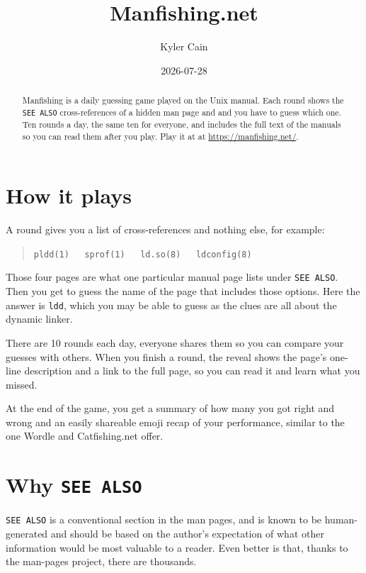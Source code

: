 \documentclass{article}
\title{Manfishing.net}
\author{Kyler Cain}
\date{2026-07-28}
\begin{document}
\maketitle

\begin{abstract}
Manfishing is a daily guessing game played on the Unix manual. Each round shows
the \verb|SEE ALSO| cross-references of a hidden man page and and you have to guess
which one. Ten rounds a day, the same ten for everyone, and includes the full text
of the manuals so you can read them after you play. Play it at at \url{https://manfishing.net/}.
\end{abstract}

\section{How it plays}

A round gives you a list of cross-references and nothing else, for example:

\begin{quote}
\verb|pldd(1)   sprof(1)   ld.so(8)   ldconfig(8)|
\end{quote}

Those four pages are what one particular manual page lists under \verb|SEE ALSO|.
Then you get to guess the name of the page that includes those options. 
Here the answer is \verb|ldd|\cite{ldd}, which you may be able to guess as the clues
are all about the dynamic linker.

There are 10 rounds each day, everyone shares them so you can compare your guesses
with others. When you finish a round, the reveal shows the page's one-line description
and a link to the full page, so you can read it and learn what you missed.

At the end of the game, you get a summary of how many you got right and wrong and an 
easily shareable emoji recap of your performance, similar to the one Wordle\cite{wordle}
and Catfishing.net\cite{catfishing} offer. 

\section{Why \texttt{SEE ALSO}}

\verb|SEE ALSO| is a conventional section in the man pages\cite{man_pages_7}, 
and is known to be human-generated and should be based on the author's expectation
of what other information would be most valuable to a reader. Even better is that,
thanks to the man-pages project\cite{man_pages_project}, there are thousands.
\end{document}
